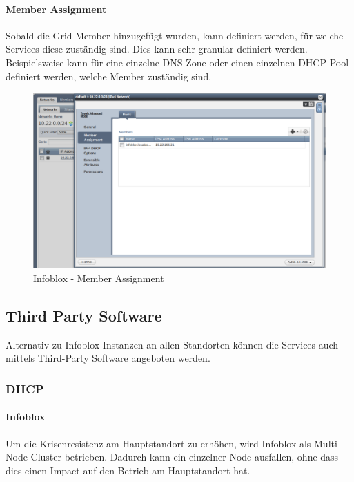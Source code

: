 \paragraph{Member Assignment}

Sobald die Grid Member hinzugefügt wurden, kann definiert werden, für welche Services diese zuständig sind. Dies kann sehr granular definiert werden. Beispielsweise kann für eine einzelne DNS Zone oder einen einzelnen DHCP Pool definiert werden, welche Member zuständig sind.

\begin{figure}[H]
	\centering
	\includegraphics[width=1\linewidth]{img/Absicherung/Infoblox_Member_Assignment.png}
	\caption{Infoblox - Member Assignment}
	\label{fig:Infoblox - Member Assignment}
\end{figure}

\subsection{Third Party Software}

Alternativ zu Infoblox Instanzen an allen Standorten können die Services auch mittels Third-Party Software angeboten werden.

\subsubsection{DHCP}

\paragraph{Infoblox}
Um die Krisenresistenz am Hauptstandort zu erhöhen, wird Infoblox als Multi-Node Cluster betrieben. Dadurch kann ein einzelner Node ausfallen, ohne dass dies einen Impact auf den Betrieb am Hauptstandort hat. 

